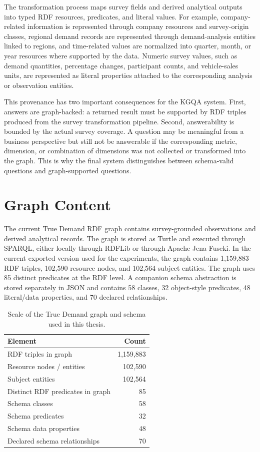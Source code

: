 \documentclass[
  12pt,
  english,
  oneside]{report}
\begin{document}
The transformation process maps survey fields and derived analytical outputs into typed RDF resources, predicates, and literal values. For example, company-related information is represented through company resources and survey-origin classes, regional demand records are represented through demand-analysis entities linked to regions, and time-related values are normalized into quarter, month, or year resources where supported by the data. Numeric survey values, such as demand quantities, percentage changes, participant counts, and vehicle-sales units, are represented as literal properties attached to the corresponding analysis or observation entities.

This provenance has two important consequences for the KGQA system. First, answers are graph-backed: a returned result must be supported by RDF triples produced from the survey transformation pipeline. Second, answerability is bounded by the actual survey coverage. A question may be meaningful from a business perspective but still not be answerable if the corresponding metric, dimension, or combination of dimensions was not collected or transformed into the graph. This is why the final system distinguishes between schema-valid questions and graph-supported questions.

\section{Graph Content}
\label{sec:graph-content}

The current True Demand RDF graph contains survey-grounded observations and derived analytical records. The graph is stored as Turtle and executed through SPARQL, either locally through RDFLib or through Apache Jena Fuseki. In the current exported version used for the experiments, the graph contains 1,159,883 RDF triples, 102,590 resource nodes, and 102,564 subject entities. The graph uses 85 distinct predicates at the RDF level. A companion schema abstraction is stored separately in JSON and contains 58 classes, 32 object-style predicates, 48 literal/data properties, and 70 declared relationships.

\begin{table}[ht]
\centering
\caption{Scale of the True Demand graph and schema used in this thesis.}
\label{tab:true-demand-scale}
\begin{tabular}{lr}
\hline
\textbf{Element} & \textbf{Count} \\
\hline
RDF triples in graph & 1,159,883 \\
Resource nodes / entities & 102,590 \\
Subject entities & 102,564 \\
Distinct RDF predicates in graph & 85 \\
Schema classes & 58 \\
Schema predicates & 32 \\
Schema data properties & 48 \\
Declared schema relationships & 70 \\
\hline
\end{tabular}
\end{table}
\end{document}
